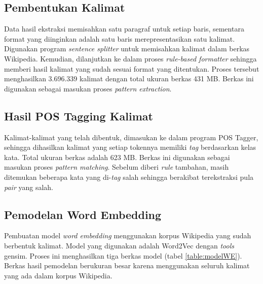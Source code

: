 \subsection{Pembentukan Kalimat}
Data hasil ekstraksi memisahkan satu paragraf untuk setiap baris, sementara format yang diinginkan adalah satu baris merepresentasikan satu kalimat. Digunakan program \textit{sentence splitter} untuk memisahkan kalimat dalam berkas Wikipedia. Kemudian, dilanjutkan ke dalam proses \textit{rule-based formatter} sehingga memberi hasil kalimat yang sudah sesuai format yang ditentukan. Proses tersebut menghasilkan 3.696.339 kalimat dengan total ukuran berkas 431 MB. Berkas ini digunakan sebagai masukan proses \textit{pattern extraction}. 

\subsection{Hasil POS Tagging Kalimat}
Kalimat-kalimat yang telah dibentuk, dimasukan ke dalam program POS Tagger, sehingga dihasilkan kalimat yang setiap tokennya memiliki \textit{tag} berdasarkan kelas kata. Total ukuran berkas adalah 623 MB. Berkas ini digunakan sebagai masukan proses \textit{pattern matching}. Sebelum diberi \textit{rule} tambahan, masih ditemukan beberapa kata yang di-\textit{tag} salah sehingga berakibat terekstraksi pula \textit{pair} yang salah. 

\subsection{Pemodelan Word Embedding}
Pembuatan model \textit{word embedding} menggunakan korpus Wikipedia yang sudah berbentuk kalimat. Model yang digunakan adalah Word2Vec dengan \textit{tools} gensim. Proses ini menghasilkan tiga berkas model (tabel \ref{table:modelWE}). Berkas hasil pemodelan berukuran besar karena menggunakan seluruh kalimat yang ada dalam korpus Wikipedia.

